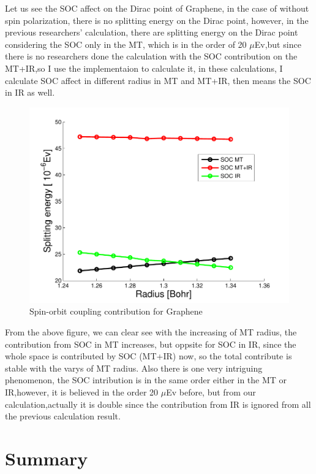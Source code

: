 \documentclass[a4paper]{report}
\begin{document}
Let us see the SOC affect on the Dirac point of Graphene, in the case of without spin polarization, there is no splitting energy on the Dirac point, however, in the 
previous researchers' calculation, there are splitting energy on the Dirac point considering the SOC only in the MT, which is in the order of 20 $\mu$Ev,but since 
there is no researchers done the calculation with the SOC contribution on the MT+IR,so I use the implementaion to calculate it, in these calculations, I calculate SOC affect in different radius in MT and MT+IR, then means the SOC in IR as well. 



\begin{figure}[ht!]
\centering
\includegraphics[width=1.0\textwidth]{splittingenergy.pdf}
\caption{Spin-orbit coupling contribution for Graphene}
\end{figure}


From the above figure, we can clear see with the increasing of MT radius, the contribution from SOC in MT increases, but oppsite for SOC in IR, since the whole space is 
contributed by SOC (MT+IR) now, so the total contribute is stable with the varys of MT radius. Also there is one very intriguing phenomenon, the SOC intribution is in the same 
order either in the MT or IR,however, it is believed in the order 20 $\mu$Ev before, but from our calculation,actually it is double since the contribution from IR is ignored from 
all the previous calculation result. 

\chapter{Summary}
\end{document}
